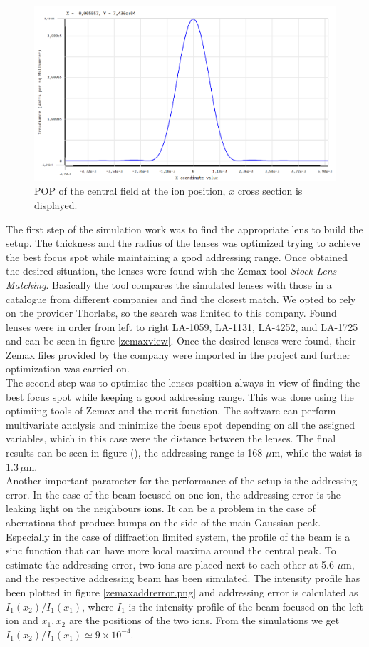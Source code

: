 \begin{figure}
    \centering
    \includegraphics[width=.8\textwidth]{img/zemaxfocus}
\caption{POP of the central field at the ion position, $x$ cross section is displayed.}
\label{zemaxfocus}
\end{figure}
The first step of the simulation work was to find the appropriate lens to build the setup. The thickness and the radius of the lenses was optimized trying to achieve the best focus spot while maintaining a good addressing range. Once obtained the desired situation, the lenses were found with the Zemax tool \emph{Stock Lens Matching}. Basically the tool compares the simulated lenses with those in a catalogue from different companies and find the closest match. We opted to rely on the provider Thorlabs, so the search was limited to this company. Found lenses were in order from left to right LA-1059, LA-1131, LA-4252, and LA-1725 and can be seen in figure \ref{zemaxview}. Once the desired lenses were found, their Zemax files provided by the company were imported in the project and further optimization was carried on.\\
The second step was to optimize the lenses position always in view of finding the best focus spot while keeping a good addressing range. This was done using the optimiing tools of Zemax and the merit function. The software can perform multivariate analysis and minimize the focus spot depending on all the assigned variables, which in this case were the distance between the lenses. The final results can be seen in figure (), the addressing range is 168 $\mu$m, while the waist is $1.3\,\mu$m.\\
 Another important parameter for the performance of the setup is the addressing error. In the case of the beam focused on one ion, the addressing error is the leaking light on the neighbours ions. It can be a problem in the case of aberrations that produce bumps on the side of the main Gaussian peak. Especially in the case of diffraction limited system, the profile of the beam is a sinc function that can have more local maxima around the central peak. To estimate the addressing error, two ions are placed next to each other at 5.6 $\mu$m, and the respective addressing beam has been simulated. The intensity profile has been plotted in figure \ref{zemaxaddrerror.png} and addressing error is calculated as $I_1(x_2)/I_1(x_1)$, where $I_1$ is the intensity profile of the beam focused on the left ion and $x_1,x_2$ are the positions of the two ions. From the simulations we get $I_1(x_2)/I_1(x_1) \simeq 9 \times 10^{-4}$.\\
